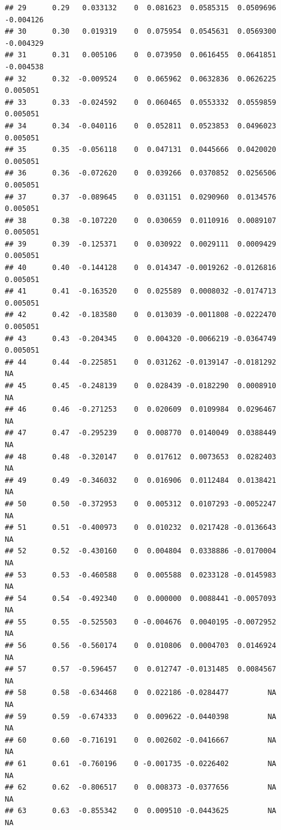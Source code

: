 \documentclass{article}\usepackage[]{graphicx}\usepackage[]{color}
\makeatletter
\newenvironment{kframe}{%
 \def\at@end@of@kframe{}%
 \ifinner\ifhmode%
  \def\at@end@of@kframe{\end{minipage}}%
  \begin{minipage}{\columnwidth}%
 \fi\fi%
 \def\FrameCommand##1{\hskip\@totalleftmargin \hskip-\fboxsep
 \colorbox{shadecolor}{##1}\hskip-\fboxsep
     \hskip-\linewidth \hskip-\@totalleftmargin \hskip\columnwidth}%
 \MakeFramed {\advance\hsize-\width
   \@totalleftmargin\z@ \linewidth\hsize
   \@setminipage}}%
 {\par\unskip\endMakeFramed%
 \at@end@of@kframe}
\newenvironment{knitrout}{}{} %
\makeatother
\begin{document}
\begin{knitrout}
\begin{kframe}
\begin{verbatim}
## 29      0.29   0.033132    0  0.081623  0.0585315  0.0509696   -0.004126
## 30      0.30   0.019319    0  0.075954  0.0545631  0.0569300   -0.004329
## 31      0.31   0.005106    0  0.073950  0.0616455  0.0641851   -0.004538
## 32      0.32  -0.009524    0  0.065962  0.0632836  0.0626225    0.005051
## 33      0.33  -0.024592    0  0.060465  0.0553332  0.0559859    0.005051
## 34      0.34  -0.040116    0  0.052811  0.0523853  0.0496023    0.005051
## 35      0.35  -0.056118    0  0.047131  0.0445666  0.0420020    0.005051
## 36      0.36  -0.072620    0  0.039266  0.0370852  0.0256506    0.005051
## 37      0.37  -0.089645    0  0.031151  0.0290960  0.0134576    0.005051
## 38      0.38  -0.107220    0  0.030659  0.0110916  0.0089107    0.005051
## 39      0.39  -0.125371    0  0.030922  0.0029111  0.0009429    0.005051
## 40      0.40  -0.144128    0  0.014347 -0.0019262 -0.0126816    0.005051
## 41      0.41  -0.163520    0  0.025589  0.0008032 -0.0174713    0.005051
## 42      0.42  -0.183580    0  0.013039 -0.0011808 -0.0222470    0.005051
## 43      0.43  -0.204345    0  0.004320 -0.0066219 -0.0364749    0.005051
## 44      0.44  -0.225851    0  0.031262 -0.0139147 -0.0181292          NA
## 45      0.45  -0.248139    0  0.028439 -0.0182290  0.0008910          NA
## 46      0.46  -0.271253    0  0.020609  0.0109984  0.0296467          NA
## 47      0.47  -0.295239    0  0.008770  0.0140049  0.0388449          NA
## 48      0.48  -0.320147    0  0.017612  0.0073653  0.0282403          NA
## 49      0.49  -0.346032    0  0.016906  0.0112484  0.0138421          NA
## 50      0.50  -0.372953    0  0.005312  0.0107293 -0.0052247          NA
## 51      0.51  -0.400973    0  0.010232  0.0217428 -0.0136643          NA
## 52      0.52  -0.430160    0  0.004804  0.0338886 -0.0170004          NA
## 53      0.53  -0.460588    0  0.005588  0.0233128 -0.0145983          NA
## 54      0.54  -0.492340    0  0.000000  0.0088441 -0.0057093          NA
## 55      0.55  -0.525503    0 -0.004676  0.0040195 -0.0072952          NA
## 56      0.56  -0.560174    0  0.010806  0.0004703  0.0146924          NA
## 57      0.57  -0.596457    0  0.012747 -0.0131485  0.0084567          NA
## 58      0.58  -0.634468    0  0.022186 -0.0284477         NA          NA
## 59      0.59  -0.674333    0  0.009622 -0.0440398         NA          NA
## 60      0.60  -0.716191    0  0.002602 -0.0416667         NA          NA
## 61      0.61  -0.760196    0 -0.001735 -0.0226402         NA          NA
## 62      0.62  -0.806517    0  0.008373 -0.0377656         NA          NA
## 63      0.63  -0.855342    0  0.009510 -0.0443625         NA          NA

\end{verbatim}
\end{kframe}
\end{knitrout}
\end{document}
